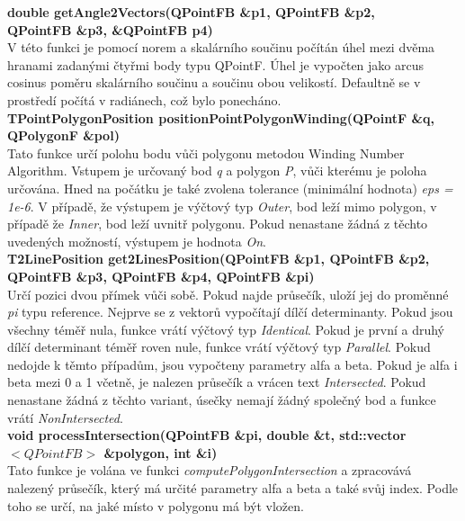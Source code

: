 \documentclass[a4paper,11pt,twoside]{article}
\begin{document}
\noindent\textbf{double getAngle2Vectors(QPointFB \&p1, QPointFB \&p2, \\ QPointFB \&p3, \&QPointFB p4)}\\
V této funkci je pomocí norem a skalárního součinu počítán úhel mezi dvěma hranami zadanými čtyřmi body typu QPointF. Úhel je vypočten jako arcus cosinus poměru skalárního součinu a součinu obou velikostí. Defaultně se v prostředí počítá v radiánech, což bylo ponecháno.\\

\noindent\textbf{TPointPolygonPosition positionPointPolygonWinding(QPointF \&q, QPolygonF \&pol)}\\
Tato funkce určí polohu bodu vůči polygonu metodou Winding Number Algorithm. Vstupem je určovaný bod \textit{q} a polygon \textit{P}, vůči kterému je poloha určována. Hned na počátku je také zvolena tolerance (minimální hodnota) \textit{eps = 1e-6}. V případě, že výstupem je výčtový typ \textit{Outer}, bod leží mimo polygon, v případě že \textit{Inner}, bod leží uvnitř polygonu. Pokud nenastane žádná z těchto uvedených možností, výstupem je hodnota \textit{On}. \\

\noindent\textbf{T2LinePosition get2LinesPosition(QPointFB \&p1, QPointFB \&p2, \\ QPointFB \&p3, QPointFB \&p4, QPointFB \&pi)}\\
Určí pozici dvou přímek vůči sobě. Pokud najde průsečík, uloží jej do proměnné \textit{pi} typu reference. Nejprve se z vektorů vypočítají dílčí determinanty. Pokud jsou všechny téměř nula, funkce vrátí výčtový typ \textit{Identical}. Pokud je první a druhý dílčí determinant téměř roven nule, funkce vrátí  výčtový typ \textit{Parallel}. Pokud nedojde k těmto případům, jsou vypočteny parametry alfa a beta. Pokud je alfa i beta mezi 0 a 1 včetně, je nalezen průsečík a vrácen text \textit{Intersected}. Pokud nenastane žádná z těchto variant, úsečky nemají žádný společný bod a funkce vrátí \textit{NonIntersected}.\\

\noindent\textbf{void processIntersection(QPointFB \&pi, double \&t, std::vector$<QPointFB>$ \&polygon, int \&i)}\\
Tato funkce je volána ve funkci \textit{computePolygonIntersection} a zpracovává nalezený průsečík, který má určité parametry alfa a beta a také svůj index. Podle toho se určí, na jaké místo v polygonu má být vložen.\\
\end{document}
